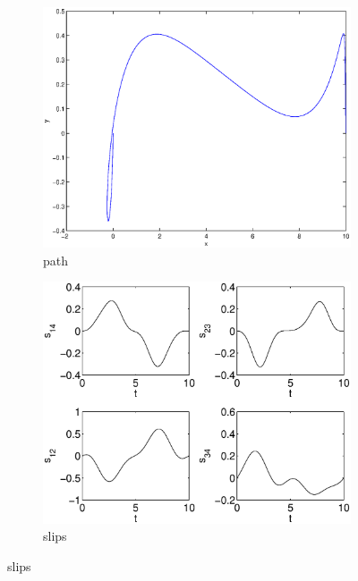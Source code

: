 \begin{figure}[h]
\begin{subfigure}[b]{\textwidth}
\centering
\includegraphics[height=0.3\textheight]{img/final_1_1_10_path.eps}
\caption{path}
\end{subfigure}

\begin{subfigure}[b]{\textwidth}
\centering
\includegraphics[height=0.3\textheight]{img/final_1_1_10_slips.eps}
\caption{slips}
\end{subfigure}


\end{figure}
